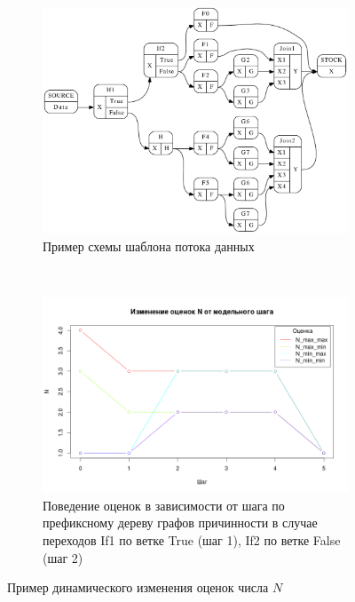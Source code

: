 \documentclass[10pt,a4paper]{article}
\begin{document}
   \begin{figure}[H]
  \centering

  \begin{subfigure}[b]{\textwidth}
    \centering
    \includegraphics[width=\textwidth]{example2.pdf}
    \caption{Пример схемы шаблона потока данных}
    \label{map:connection}
  \end{subfigure}
  ~
  \begin{subfigure}[b]{\textwidth}
    \centering
    \includegraphics[width=\textwidth]{Rplot01}
    \caption{Поведение оценок в зависимости от шага по префиксному дереву графов причинности
             в случае переходов If1 по ветке True (шаг 1), If2 по ветке False (шаг 2)}
    \label{map:fa}
  \end{subfigure}
  
  \caption{Пример динамического изменения оценок числа $N$}
  \label{example2}
  \end{figure}
  
\end{document}
